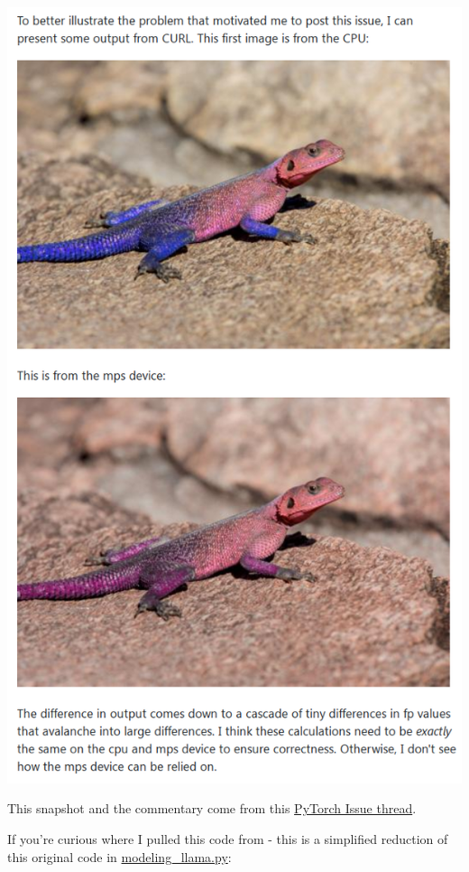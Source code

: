 \documentclass[
]{report}
\begin{document}
\includegraphics{images/math-fp-discrepancy-outcome-lizard.png}

This snapshot and the commentary come from this
\href{https://github.com/pytorch/pytorch/issues/84936\#issuecomment-1246084645}{PyTorch
Issue thread}.

If you're curious where I pulled this code from - this is a simplified
reduction of this original code in
\href{https://github.com/huggingface/transformers/blob/3f69f415adcbdaedec154ba8eac220ef3276975d/src/transformers/models/llama/modeling_llama.py\#L130}{modeling\_llama.py}:
\end{document}
